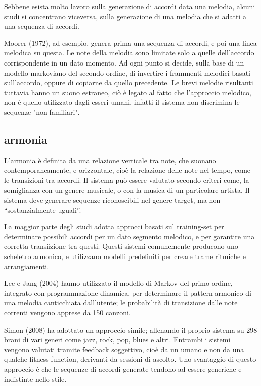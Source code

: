 \documentclass[a4paper,12pt]{report}
\begin{document}
Sebbene esista molto lavoro sulla generazione di accordi data una melodia, alcuni studi si concentrano viceversa, sulla generazione di una melodia che si adatti a una sequenza di accordi.

Moorer (1972), ad esempio, genera prima una sequenza di accordi, e poi una linea melodica su questa.
Le note della melodia sono limitate solo a quelle dell'accordo corrispondente in un dato momento. 
Ad ogni punto si decide, sulla base di un modello markoviano del secondo ordine, di invertire i frammenti melodici basati sull'accordo, oppure di copiarne da quello precedente.
Le brevi melodie risultanti tuttavia hanno un suono estraneo, ciò è legato al fatto che l'approccio melodico, non è quello utilizzato dagli esseri umani, infatti il sistema non discrimina le sequenze "non familiari".

\subsection{armonia}

L'armonia è definita da una relazione verticale tra note, che suonano contemporaneamente, e orizzontale, cioè la relazione delle note nel tempo, come le transizioni tra accordi.
Il sistema può essere valutato secondo criteri come, la somiglianza con un genere musicale, o con la musica di un particolare artista.
Il sistema deve generare sequenze riconoscibili nel genere target, ma non “sostanzialmente uguali”.

La maggior parte degli studi adotta approcci basati sul training-set per determinare possibili accordi per un dato segmento melodico, e per garantire una corretta transiizione tra questi.
Questi sistemi comunemente producono uno scheletro armonico, e utilizzano modelli predefiniti per creare trame ritmiche e arrangiamenti.

Lee e Jang (2004) hanno utilizzato il modello di Markov del primo ordine, integrato con programmazione dinamica, per determinare il pattern armonico di una melodia canticchiata dall'utente; 
le probabilità di transizione dalle note correnti vengono apprese da 150 canzoni. 

Simon (2008) ha adottato un approccio simile; allenando il proprio sistema su 298 brani di vari generi come jazz, rock, pop, blues e altri. 
Entrambi i sistemi vengono valutati tramite feedback soggettivo, cioè da un umano e non da una qualche fitness-function, derivanti da sessioni di ascolto. 
Uno svantaggio di questo approccio è che le sequenze di accordi generate tendono ad essere generiche e indistinte nello stile.
\end{document}
